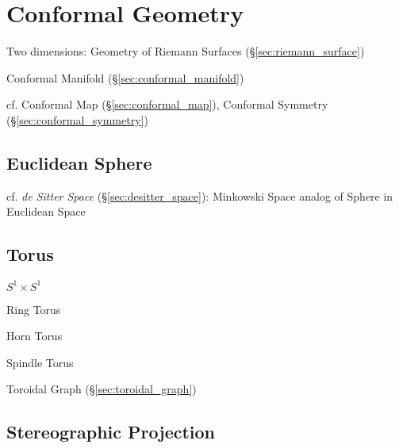\section{Conformal Geometry}\label{sec:conformal_geometry}

Two dimensions: Geometry of Riemann Surfaces
(\S\ref{sec:riemann_surface})

\fist Conformal Manifold (\S\ref{sec:conformal_manifold})

cf. Conformal Map (\S\ref{sec:conformal_map}),
Conformal Symmetry (\S\ref{sec:conformal_symmetry})



\subsection{Euclidean Sphere}\label{sec:euclidean_sphere}

cf. \emph{de Sitter Space} (\S\ref{sec:desitter_space}): Minkowski Space analog
of Sphere in Euclidean Space



\subsection{Torus}\label{sec:torus}

$S^1 \times S^1$

Ring Torus

Horn Torus

Spindle Torus

\fist Toroidal Graph (\S\ref{sec:toroidal_graph})



\subsection{Stereographic Projection}\label{sec:stereographic_projection}

